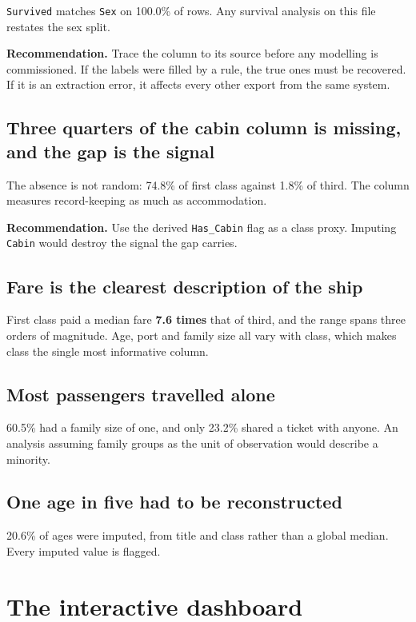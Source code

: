 \documentclass[12pt,a4paper]{article}
\newcommand{\F}[1]{\texttt{\small #1}}
\begin{document}
\F{Survived} matches \F{Sex} on 100.0\% of rows.
Any survival analysis on this file restates the sex split.

\textbf{Recommendation.} Trace the column to its source before any modelling is
commissioned. If the labels were filled by a rule, the true ones must be recovered.
If it is an extraction error, it affects every other export from the same system.

\subsection{Three quarters of the cabin column is missing, and the gap is the signal}

The absence is not random: 74.8\% of first class against
1.8\% of third. The column measures record-keeping as much as
accommodation.

\textbf{Recommendation.} Use the derived \F{Has\_Cabin} flag as a class proxy.
Imputing \F{Cabin} would destroy the signal the gap carries.

\subsection{Fare is the clearest description of the ship}

First class paid a median fare \textbf{7.6 times} that of
third, and the range spans three orders of magnitude. Age, port and family size all
vary with class, which makes class the single most informative column.

\subsection{Most passengers travelled alone}

60.5\% had a family size of one, and only
23.2\% shared a ticket with anyone. An analysis
assuming family groups as the unit of observation would describe a minority.

\subsection{One age in five had to be reconstructed}

20.6\% of ages were imputed, from title and class rather
than a global median. Every imputed value is flagged.

\section{The interactive dashboard}
\end{document}
